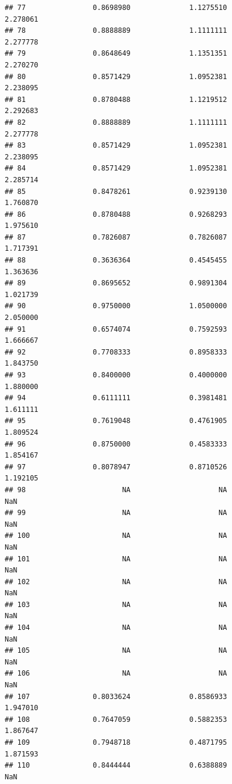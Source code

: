 \documentclass[]{article}
\begin{document}
\begin{verbatim}
## 77                0.8698980              1.1275510               2.278061
## 78                0.8888889              1.1111111               2.277778
## 79                0.8648649              1.1351351               2.270270
## 80                0.8571429              1.0952381               2.238095
## 81                0.8780488              1.1219512               2.292683
## 82                0.8888889              1.1111111               2.277778
## 83                0.8571429              1.0952381               2.238095
## 84                0.8571429              1.0952381               2.285714
## 85                0.8478261              0.9239130               1.760870
## 86                0.8780488              0.9268293               1.975610
## 87                0.7826087              0.7826087               1.717391
## 88                0.3636364              0.4545455               1.363636
## 89                0.8695652              0.9891304               1.021739
## 90                0.9750000              1.0500000               2.050000
## 91                0.6574074              0.7592593               1.666667
## 92                0.7708333              0.8958333               1.843750
## 93                0.8400000              0.4000000               1.880000
## 94                0.6111111              0.3981481               1.611111
## 95                0.7619048              0.4761905               1.809524
## 96                0.8750000              0.4583333               1.854167
## 97                0.8078947              0.8710526               1.192105
## 98                       NA                     NA                    NaN
## 99                       NA                     NA                    NaN
## 100                      NA                     NA                    NaN
## 101                      NA                     NA                    NaN
## 102                      NA                     NA                    NaN
## 103                      NA                     NA                    NaN
## 104                      NA                     NA                    NaN
## 105                      NA                     NA                    NaN
## 106                      NA                     NA                    NaN
## 107               0.8033624              0.8586933               1.947010
## 108               0.7647059              0.5882353               1.867647
## 109               0.7948718              0.4871795               1.871593
## 110               0.8444444              0.6388889                    NaN

\end{verbatim}
\end{document}
